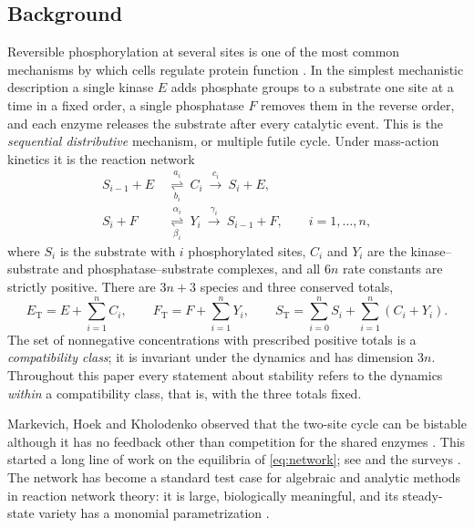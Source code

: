 \documentclass[11pt]{article}
\theoremstyle{plain}
\theoremstyle{definition}
\theoremstyle{remark}
\numberwithin{equation}{section}
\newcommand{\ET}{E_{\mathrm T}}
\newcommand{\FT}{F_{\mathrm T}}
\newcommand{\ST}{S_{\mathrm T}}
\begin{document}
\subsection{Background}
Reversible phosphorylation at several sites is one of the most common mechanisms by which cells
regulate protein function \cite{Cohen2000,SalazarHofer2009}. In the simplest mechanistic
description a single kinase \(E\) adds phosphate groups to a substrate one site at a time in a
fixed order, a single phosphatase \(F\) removes them in the reverse order, and each enzyme
releases the substrate after every catalytic event. This is the \emph{sequential distributive}
mechanism, or multiple futile cycle. Under mass-action kinetics it is the reaction network
\begin{equation}\label{eq:network}
\begin{aligned}
 S_{i-1}+E &\ \underset{b_i}{\overset{a_i}{\rightleftharpoons}}\ C_i
       \ \xrightarrow{\ c_i\ }\ S_i+E,\\[3pt]
 S_i+F &\ \underset{\beta_i}{\overset{\alpha_i}{\rightleftharpoons}}\ Y_i
       \ \xrightarrow{\ \gamma_i\ }\ S_{i-1}+F,
       \qquad i=1,\dots,n,
\end{aligned}
\end{equation}
where \(S_i\) is the substrate with \(i\) phosphorylated sites, \(C_i\) and \(Y_i\) are the
kinase--substrate and phosphatase--substrate complexes, and all \(6n\) rate constants are
strictly positive. There are \(3n+3\) species and three conserved totals,
\begin{equation}\label{eq:totals}
 \ET=E+\sum_{i=1}^n C_i,\qquad
 \FT=F+\sum_{i=1}^n Y_i,\qquad
 \ST=\sum_{i=0}^n S_i+\sum_{i=1}^n(C_i+Y_i).
\end{equation}
The set of nonnegative concentrations with prescribed positive totals is a
\emph{compatibility class}; it is invariant under the dynamics and has dimension \(3n\).
Throughout this paper every statement about stability refers to the dynamics \emph{within} a
compatibility class, that is, with the three totals fixed.

Markevich, Hoek and Kholodenko observed that the two-site cycle can be bistable although it has
no feedback other than competition for the shared enzymes \cite{Markevich2004}. This started a
long line of work on the equilibria of \eqref{eq:network}; see
\cite{Gunawardena2005,ConradiFlockerziRaisch2008,ThomsonGunawardena2009,FeliuWiuf2012,
HolsteinFlockerziConradi2013,ConradiMincheva2014,HellRendall2015,CFMW2017,
BihanDickensteinGiaroli2020,FKdWY2022,TorresFeliu2021} and the surveys
\cite{ConradiShiu2018,Dickenstein2016,Dickenstein2020}. The network has become a standard test
case for algebraic and analytic methods in reaction network theory: it is large, biologically
meaningful, and its steady-state variety has a monomial parametrization \cite{PDSC2012}.
\end{document}
